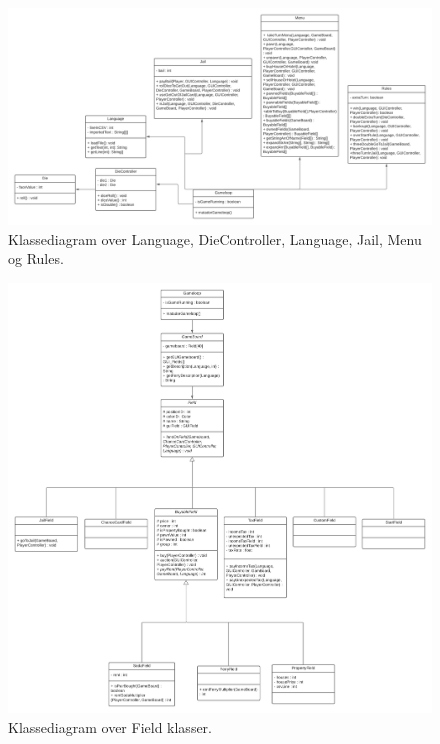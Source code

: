 \begin{flushleft}
\begin{figure}[H]
    \centering
    \includegraphics[width=15cm]{Report/figures/Klassediagram/DieController_Language_Jail_Men_Rule_klassediagram.png}
    \caption{Klassediagram over Language, DieController, Language, Jail, Menu og Rules.}
    \label{Klasse_Menu}
\end{figure}\begin{figure}[H]
    \centering
    \includegraphics[width=15cm]{Report/figures/Klassediagram/Field_klassediagram.png}
    \caption{Klassediagram over Field klasser.}
    \label{Klasse_Field}
\end{figure}\begin{figure}[H]
    \centering

\end{figure}
\end{flushleft}
